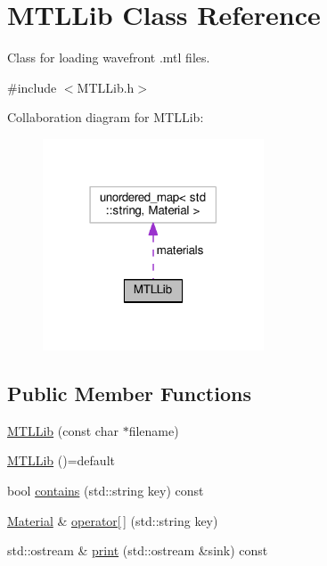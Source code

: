 \hypertarget{classMTLLib}{}\section{M\+T\+L\+Lib Class Reference}
\label{classMTLLib}


Class for loading wavefront .mtl files.  




{\ttfamily \#include $<$M\+T\+L\+Lib.\+h$>$}



Collaboration diagram for M\+T\+L\+Lib\+:\nopagebreak
\begin{figure}[H]
\begin{center}
\leavevmode
\includegraphics[width=186pt]{classMTLLib__coll__graph}
\end{center}
\end{figure}
\subsection*{Public Member Functions}
\begin{DoxyCompactItemize}
\item 
\hyperlink{classMTLLib_a9d67275ad7ced3768135bd40bc821616}{M\+T\+L\+Lib} (const char $\ast$filename)
\item 
\hyperlink{classMTLLib_a1f6320f63cdc48012b12b993ce74777c}{M\+T\+L\+Lib} ()=default
\item 
bool \hyperlink{classMTLLib_a7c7743ed1a557874d470f8bc7946801f}{contains} (std\+::string key) const 
\item 
\hyperlink{classMaterial}{Material} \& \hyperlink{classMTLLib_a47584cec05a84d6b173c655515788b76}{operator\mbox{[}$\,$\mbox{]}} (std\+::string key)
\item 
std\+::ostream \& \hyperlink{classMTLLib_a9c5381e22b3572af42e7b23335ea8074}{print} (std\+::ostream \&sink) const 
\end{DoxyCompactItemize}
